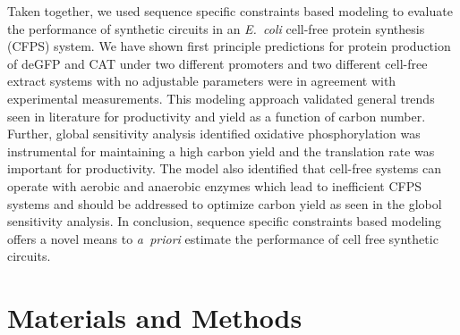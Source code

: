 \documentclass[journal=asbcd6,manuscript=article]{achemso}
\begin{document}
Taken together, we used sequence specific constraints based modeling to evaluate the performance of synthetic circuits in an \emph{E.~coli} cell-free protein synthesis (CFPS) system.
We have shown first principle predictions for protein production of deGFP and CAT under two different promoters and two different cell-free extract systems with no adjustable parameters were in agreement with experimental measurements.
This modeling approach validated general trends seen in literature for productivity and yield as a function of carbon number.
Further, global sensitivity analysis identified oxidative phosphorylation was instrumental for maintaining a high carbon yield and the translation rate was important for productivity.
The model also identified that cell-free systems can operate with aerobic and anaerobic enzymes which lead to inefficient CFPS systems and should be addressed to optimize carbon yield as seen in the globol sensitivity analysis.
In conclusion, sequence specific constraints based modeling offers a novel means to \emph{a~priori} estimate the performance of cell free synthetic circuits.


\section*{Materials and Methods}
\end{document}
